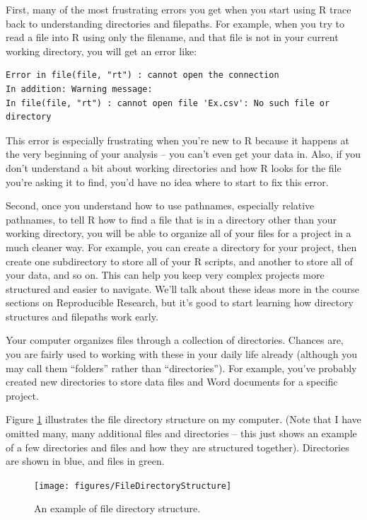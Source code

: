 \documentclass[]{book}
\theoremstyle{definition}
\theoremstyle{definition}
\theoremstyle{definition}
\theoremstyle{remark}
\begin{document}
First, many of the most frustrating errors you get when you start using
R trace back to understanding directories and filepaths. For example,
when you try to read a file into R using only the filename, and that
file is not in your current working directory, you will get an error
like:

\begin{verbatim}
Error in file(file, "rt") : cannot open the connection
In addition: Warning message:
In file(file, "rt") : cannot open file 'Ex.csv': No such file or directory
\end{verbatim}

This error is especially frustrating when you're new to R because it
happens at the very beginning of your analysis -- you can't even get
your data in. Also, if you don't understand a bit about working
directories and how R looks for the file you're asking it to find, you'd
have no idea where to start to fix this error.

Second, once you understand how to use pathnames, especially relative
pathnames, to tell R how to find a file that is in a directory other
than your working directory, you will be able to organize all of your
files for a project in a much cleaner way. For example, you can create a
directory for your project, then create one subdirectory to store all of
your R scripts, and another to store all of your data, and so on. This
can help you keep very complex projects more structured and easier to
navigate. We'll talk about these ideas more in the course sections on
Reproducible Research, but it's good to start learning how directory
structures and filepaths work early.

Your computer organizes files through a collection of directories.
Chances are, you are fairly used to working with these in your daily
life already (although you may call them ``folders'' rather than
``directories''). For example, you've probably created new directories
to store data files and Word documents for a specific project.

Figure \ref{fig:filedirstructure} illustrates the file directory
structure on my computer. (Note that I have omitted many, many
additional files and directories -- this just shows an example of a few
directories and files and how they are structured together). Directories
are shown in blue, and files in green.

\begin{figure}

{\centering \texttt{[image: figures/FileDirectoryStructure]} 

}

\caption{An example of file directory structure.}\label{fig:filedirstructure}
\end{figure}
\end{document}
